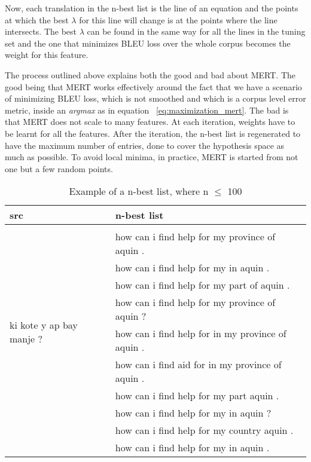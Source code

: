 Now, each translation in the n-best list is the line of an equation and the points at which the best $\lambda$ for this line will change is at the points where the line intersects. The best $\lambda$ can be found in the same way for all the lines in the tuning set and the one that minimizes BLEU loss over the whole corpus becomes the weight for this feature. 

The process outlined above explains both the good and bad about MERT. The good being that MERT works effectively around the fact that we have a scenario of minimizing BLEU loss, which is not smoothed and which is a corpus level error metric, inside an \emph{argmax} as in equation ~\eqref{eq:maximization_mert}. The bad is that MERT does not scale to many features. At each iteration, weights have to be learnt for all the features. After the iteration, the n-best list is regenerated to have the maximum number of entries, done to cover the hypothesis space as much as possible. To avoid local minima, in practice, MERT is started from not one but a few random points.



\begin{table*}
	\begin{tabular}{p{}p{}}
		\toprule
		src & n-best list \\
		\toprule
		\multirow{10}{*}{ki kote y ap bay manje ?}  & \\ 
		& how can i find help for my province of aquin . \\
		& how can i find help for my in aquin . \\
		& how can i find help for my part of aquin . \\
		& how can i find help for my province of aquin ? \\
		& how can i find help for in my province of aquin . \\
		& how can i find aid for in my province of aquin . \\
		& how can i find help for my part aquin . \\
		& how can i find help for my in aquin ?  \\
		& how can i find help for my country aquin . \\
		& how can i find help for my in aquin . \\
		\bottomrule
	\end{tabular}
	\caption{Example of a n-best list, where n $\leq$ 100}
	\label{table:nbest}
\end{table*}





